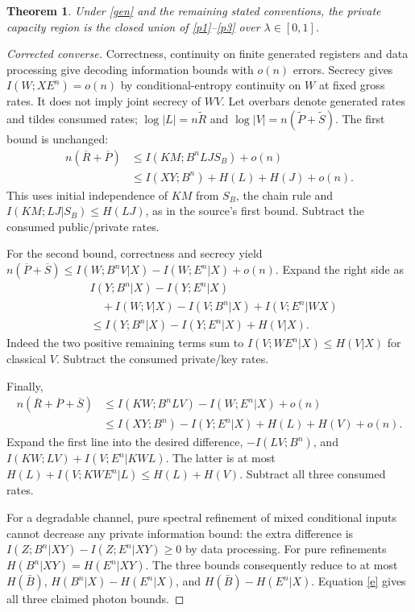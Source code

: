 \documentclass[11pt]{article}
\newtheorem{theorem}{Theorem}
\begin{document}
\begin{theorem}\label{rps}
Under \eqref{gen} and the remaining stated conventions, the
private capacity region is the closed union of
\eqref{p1}--\eqref{p3} over $\lambda\in[0,1]$.
\end{theorem}
\begin{proof}[Corrected converse]
Correctness, continuity on finite generated registers and data
processing give decoding information bounds with $o(n)$ errors.
Secrecy gives $I(W;XE^n)=o(n)$ by conditional-entropy continuity
on $W$ at fixed gross rates. It does not imply joint secrecy of $WV$.
Let overbars denote generated rates and tildes consumed rates;
$\log|L|=n\widetilde R$ and
$\log|V|=n(\widetilde P+\widetilde S)$.
The first bound is unchanged:
\begin{align*}
 n(\overline R+\overline P)
 &\le I(KM;B^nLJS_B)+o(n)\\
 &\le I(XY;B^n)+H(L)+H(J)+o(n).
\end{align*}
This uses initial independence of $KM$ from $S_B$, the chain
rule and $I(KM;LJ|S_B)\le H(LJ)$, as in the source's first bound.
Subtract the consumed public/private rates.

For the second bound, correctness and secrecy yield
$n(\overline P+\overline S)\le
I(W;B^nV|X)-I(W;E^n|X)+o(n)$.
Expand the right side as
\begin{align*}
 &I(Y;B^n|X)-I(Y;E^n|X)\\
 &\quad+I(W;V|X)-I(V;B^n|X)+I(V;E^n|WX)\\
 &\le I(Y;B^n|X)-I(Y;E^n|X)+H(V|X).
\end{align*}
Indeed the two positive remaining terms sum to
$I(V;WE^n|X)\le H(V|X)$ for classical $V$.
Subtract the consumed private/key rates.

Finally,
\begin{align*}
 n(\overline R+\overline P+\overline S)
 &\le I(KW;B^nLV)-I(W;E^n|X)+o(n)\\
 &\le I(XY;B^n)-I(Y;E^n|X)+H(L)+H(V)+o(n).
\end{align*}
Expand the first line into the desired difference,
$-I(LV;B^n)$, and
$I(KW;LV)+I(V;E^n|KWL)$.
The latter is at most
$H(L)+I(V;KWE^n|L)\le H(L)+H(V)$.
Subtract all three consumed rates.

For a degradable channel, pure spectral refinement of mixed
conditional inputs cannot decrease any private information bound:
the extra difference is
$I(Z;B^n|XY)-I(Z;E^n|XY)\ge0$ by data processing.
For pure refinements $H(B^n|XY)=H(E^n|XY)$.
The three bounds consequently reduce to at most
$H(\bar B)$, $H(B^n|X)-H(E^n|X)$, and
$H(\bar B)-H(E^n|X)$.
Equation \eqref{e} gives all three claimed photon bounds.
\end{proof}
\end{document}
